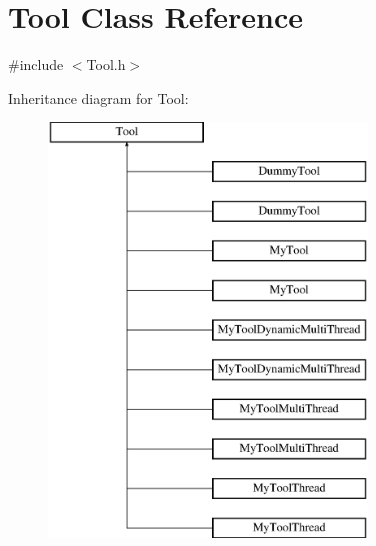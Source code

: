 \hypertarget{classTool}{\section{Tool Class Reference}
\label{classTool}
}


{\ttfamily \#include $<$Tool.\-h$>$}

Inheritance diagram for Tool\-:\begin{figure}[H]
\begin{center}
\leavevmode
\includegraphics[height=11.000000cm]{classTool}
\end{center}
\end{figure}
